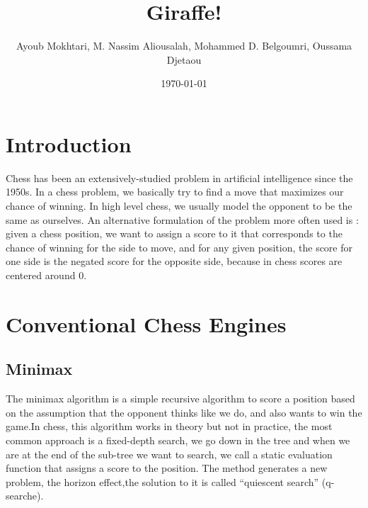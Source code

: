 \documentclass[12pt, a4paper]{report}
\author{Ayoub Mokhtari, M. Nassim Aliousalah, Mohammed D. Belgoumri, Oussama Djetaou}
\date{\today}
\title{Giraffe!}
\begin{document}
	\maketitle
	\newpage
    \tableofcontents
    \newpage
	\chapter{Introduction}
	\indent Chess has been an extensively-studied problem in artificial intelligence since the 1950s. In a chess problem, we basically try to find a move that maximizes our chance of winning. In high level chess, we usually model the opponent to be the same as ourselves.
	An alternative formulation of the problem more often used is : given a chess position, we want to assign a score to it that corresponds to the chance of winning for the side to move, and for any given position, the score for one side is the negated score for the opposite side, because in chess scores are centered around 0.
	
	\chapter{Conventional Chess Engines}
		\section{Minimax}
		The minimax algorithm is a simple recursive algorithm to score a position based on the assumption that the opponent thinks like we do, and also wants to win the game.In chess, this algorithm works in theory but not in practice, the most common approach is a fixed-depth search, we go down in the tree and when we are at the end of the sub-tree we want to search, we call a static evaluation function that assigns a score to the position.
		The method generates a new problem, the horizon effect,the solution to it is called “quiescent search” (q-searche).
\end{document}

